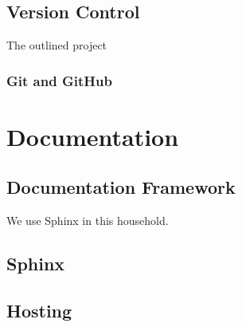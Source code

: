 \subsection{Version Control}
The outlined project 
\subsubsection{Git and GitHub}

\section{Documentation}
\subsection{Documentation Framework}
We use Sphinx in this household.
\subsection{Sphinx}

\subsection{Hosting}


